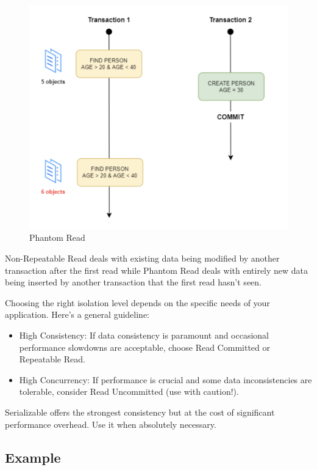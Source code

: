 \begin{figure}[H]
  \includegraphics[width=\linewidth]{images/jdbc/phantom_read.png}
  \caption{Phantom Read}
  \label{fig:paths}
\end{figure}


Non-Repeatable Read deals with existing data being modified by another transaction after the first read while Phantom Read deals with entirely new data being inserted by another transaction that the first read hasn't seen.

Choosing the right isolation level depends on the specific needs of your application. Here's a general guideline:

\begin{itemize}
\item High Consistency: If data consistency is paramount and occasional performance slowdowns are acceptable, choose Read Committed or Repeatable Read.

\item High Concurrency: If performance is crucial and some data inconsistencies are tolerable, consider Read Uncommitted (use with caution!).
\end{itemize}

Serializable offers the strongest consistency but at the cost of significant performance overhead. Use it when absolutely necessary.


\subsection{Example}

